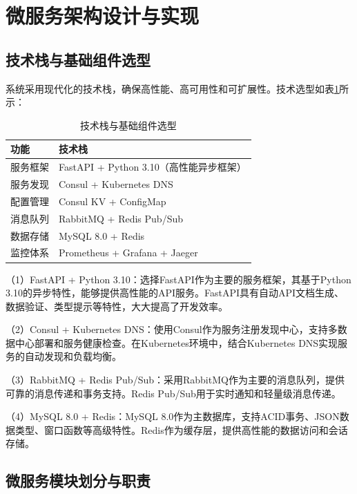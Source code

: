 \section{微服务架构设计与实现}

\subsection{技术栈与基础组件选型}

系统采用现代化的技术栈，确保高性能、高可用性和可扩展性。技术选型如表\ref{table:tech_stack}所示：

\begin{table}[H]
    \caption{技术栈与基础组件选型}
    \label{table:tech_stack}
    \centering
    \begin{tabular}{|l|l|}
        \hline
        \textbf{功能} & \textbf{技术栈} \\
        \hline
        服务框架 & FastAPI + Python 3.10（高性能异步框架） \\
        服务发现 & Consul + Kubernetes DNS \\
        配置管理 & Consul KV + ConfigMap \\
        消息队列 & RabbitMQ + Redis Pub/Sub \\
        数据存储 & MySQL 8.0 + Redis \\
        监控体系 & Prometheus + Grafana + Jaeger \\
        \hline
    \end{tabular}
\end{table}

（1）FastAPI + Python 3.10：选择FastAPI作为主要的服务框架，其基于Python 3.10的异步特性，能够提供高性能的API服务。FastAPI具有自动API文档生成、数据验证、类型提示等特性，大大提高了开发效率。

（2）Consul + Kubernetes DNS：使用Consul作为服务注册发现中心，支持多数据中心部署和服务健康检查。在Kubernetes环境中，结合Kubernetes DNS实现服务的自动发现和负载均衡。

（3）RabbitMQ + Redis Pub/Sub：采用RabbitMQ作为主要的消息队列，提供可靠的消息传递和事务支持。Redis Pub/Sub用于实时通知和轻量级消息传递。

（4）MySQL 8.0 + Redis：MySQL 8.0作为主数据库，支持ACID事务、JSON数据类型、窗口函数等高级特性。Redis作为缓存层，提供高性能的数据访问和会话存储。

\subsection{微服务模块划分与职责}

